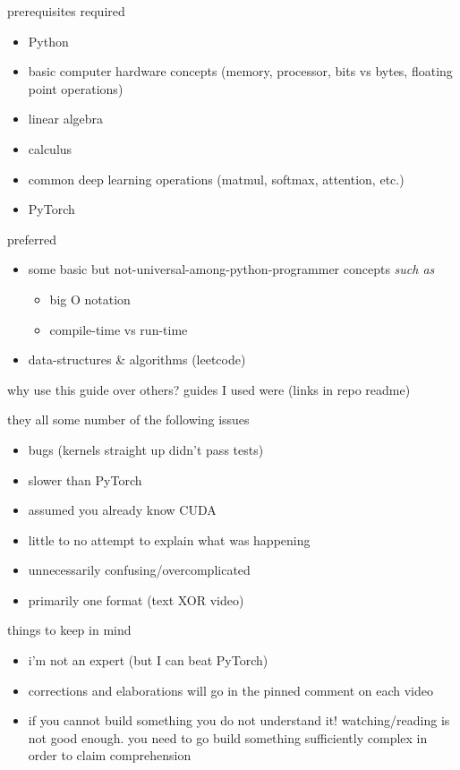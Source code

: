 \documentclass[aspectratio=169]{beamer}
\begin{document}
\begin{frame}{prerequisites}
required
\begin{itemize}
    \item Python
    \item basic computer hardware concepts (memory, processor, bits vs bytes, floating point operations)
    \item linear algebra
    \item calculus 
    \item common deep learning operations (matmul, softmax, attention, etc.)
    \item PyTorch
\end{itemize}
preferred
\begin{itemize}
    \item some basic but not-universal-among-python-programmer concepts \textit{such as}
    \begin{itemize}
        \item big O notation
        \item compile-time vs run-time
    \end{itemize}
    \item data-structures \& algorithms (leetcode)
\end{itemize}
\end{frame}

\begin{frame}{why use this guide over others?}
guides I used were (links in repo readme)
they all some number of the following issues
\begin{itemize}
    \item bugs (kernels straight up didn't pass tests)
    \item slower than PyTorch
    \item assumed you already know CUDA
    \item little to no attempt to explain what was happening
    \item unnecessarily confusing/overcomplicated
    \item primarily one format (text XOR video)
\end{itemize}
\end{frame}

\begin{frame}{things to keep in mind}
\vspace{-1.0in}
\begin{itemize}
    \item i'm not an expert (but I can beat PyTorch)
    \item corrections and elaborations will go in the pinned comment on each video
    \item if you cannot build something you do not understand it! watching/reading is not good enough. you need to go build something sufficiently complex in order to claim comprehension
\end{itemize}
\end{frame}
\end{document}
